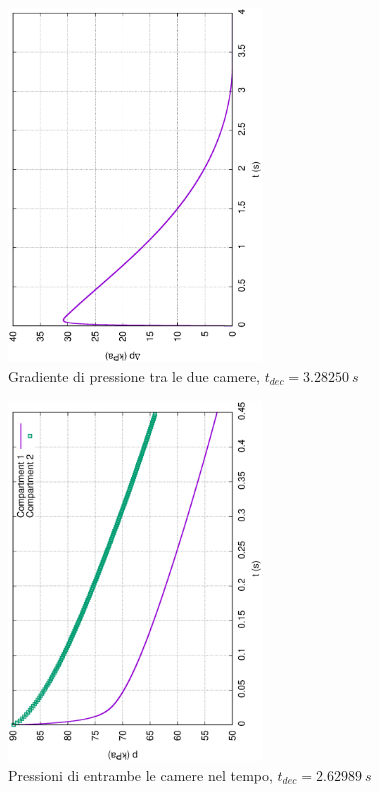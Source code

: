 \documentclass{article}
\begin{document}
        \begin{figure}[h!]
            \centering
            \label{fig:grad_cam_0}
            \includegraphics[width=0.6\textwidth, angle=-90]{MUL2/Esercitazione1/1A/Dp.eps}
            \caption{Gradiente di pressione tra le due camere, $t_{dec} = 3.28250 \ s$}
        \end{figure}
        \clearpage
        
        \begin{figure}[h!]
            \centering
            \label{fig:press_cam_0.5}
            \includegraphics[width=0.6\textwidth, angle=-90]{MUL2/Esercitazione1/1B/p.eps}
            \caption{Pressioni di entrambe le camere nel tempo, $t_{dec} = 2.62989 \ s$}
        \end{figure}
\end{document}
